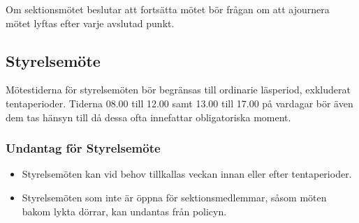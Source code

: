 \documentclass[]{dsekprotokoll}
\begin{document}
Om sektionsmötet beslutar att fortsätta mötet bör frågan om att
ajournera mötet lyftas
efter varje avslutad punkt.

\subsection{Styrelsemöte}
Mötestiderna för styrelsemöten bör begränsas till ordinarie
läsperiod, exkluderat tentaperioder. Tiderna 08.00 till 12.00 samt
13.00 till 17.00 på vardagar bör även dem tas hänsyn till då dessa
ofta innefattar obligatoriska moment.

\subsubsection{Undantag för Styrelsemöte}
\begin{itemize}
  \item Styrelsemöten kan vid behov tillkallas veckan innan eller
    efter tentaperioder.
  \item Styrelsemöten som inte är öppna för sektionsmedlemmar, såsom
    möten bakom lykta dörrar, kan undantas från policyn.
\end{itemize}
\end{document}
